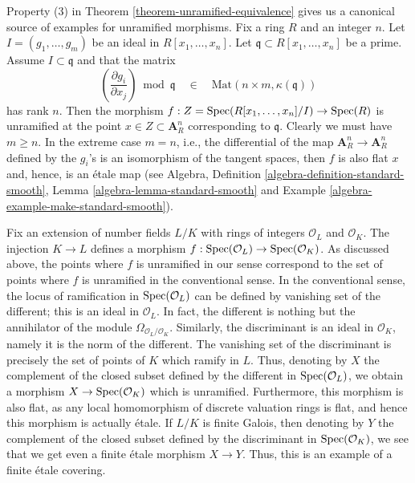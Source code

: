 \begin{example}
\label{example-standard-etale}
Property (3) in
Theorem \ref{theorem-unramified-equivalence}
gives us a canonical source of examples for unramified morphisms.
Fix a ring $R$ and an integer $n$. Let $I = (g_1, \ldots, g_m)$ be an
ideal in $R[x_1, \ldots, x_n]$. Let $\mathfrak q \subset R[x_1, \ldots, x_n]$
be a prime. Assume $I \subset \mathfrak q$ and that the matrix
$$
\left(\frac{\partial g_i}{\partial x_j}\right) \bmod \mathfrak q
\quad\in\quad
\text{Mat}(n \times m, \kappa(\mathfrak q))
$$
has rank $n$. Then the morphism
$f : Z = \mathop{\mathrm{Spec}}(R[x_1, \ldots, x_n]/I) \to \mathop{\mathrm{Spec}}(R)$
is unramified at the point $x \in Z \subset \mathbf{A}^n_R$ corresponding
to $\mathfrak q$. Clearly we must have $m \geq n$.
In the extreme case $m = n$, i.e., the differential of the map
$\mathbf{A}^n_R \to \mathbf{A}^n_R$ defined by the $g_i$'s
is an isomorphism of the tangent spaces, then $f$ is also flat
$x$ and, hence, is an \'etale map (see Algebra,
Definition \ref{algebra-definition-standard-smooth},
Lemma \ref{algebra-lemma-standard-smooth} and
Example \ref{algebra-example-make-standard-smooth}).
\end{example}

\begin{example}
\label{example-number-theory-etale}
Fix an extension of number fields $L/K$ with rings of integers
$\mathcal{O}_L$ and $\mathcal{O}_K$. The injection $K \to L$ defines a
morphism $f : \mathop{\mathrm{Spec}}(\mathcal{O}_L) \to \mathop{\mathrm{Spec}}(\mathcal{O}_K)$.
As discussed above, the points where $f$ is unramified in our sense
correspond to the set of points where $f$ is unramified in the conventional
sense. In the conventional sense, the locus of ramification in
$\mathop{\mathrm{Spec}}(\mathcal{O}_L)$ can be defined by vanishing set of the
different; this is an ideal in $\mathcal{O}_L$. In fact, the different is
nothing but the annihilator of the module
$\Omega_{\mathcal{O}_L/\mathcal{O}_K}$. Similarly, the
discriminant is an ideal in $\mathcal{O}_K$, namely it is the
norm of the different.
The vanishing set of the discriminant is precisely the set
of points of $K$ which ramify in $L$.
Thus, denoting by $X$ the complement of the closed subset
defined by the different in $\mathop{\mathrm{Spec}}(\mathcal{O}_L)$,
we obtain a morphism $X \to \mathop{\mathrm{Spec}}(\mathcal{O}_K)$ which is unramified.
Furthermore, this morphism is also flat, as any local homomorphism
of discrete valuation rings is flat, and hence this morphism is
actually \'etale. If $L/K$ is finite Galois, then denoting by
$Y$ the complement of the closed subset defined by the discriminant in
$\mathop{\mathrm{Spec}}(\mathcal{O}_K)$, we see that we get even a
finite \'etale morphism $X \to Y$.
Thus, this is an example of a finite \'etale covering.
\end{example}





